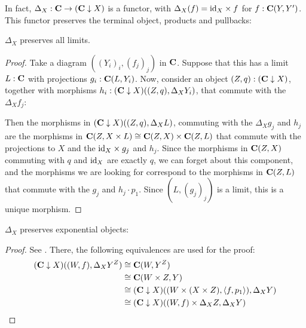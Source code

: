 In fact, $ \Delta_X : \mathbf{C} \to (\mathbf{C} \downarrow X) $ is a functor, with $ \Delta_X(f) = \text{id}_{X} \times f $ for $ f: \mathbf{C}(Y, Y^\prime) $. This functor preserves the terminal object, products and pullbacks:
\begin{lemma}\label{lem:delta-limits}
  $ \Delta_X $ preserves all limits.
\end{lemma}
\begin{proof}
  Take a diagram $ ((Y_i)_i, (f_j)_j) $ in $ \mathbf{C} $. Suppose that this has a limit $ L : \mathbf{C} $ with projections $ g_i : \mathbf{C}(L, Y_i) $. Now, consider an object $ (Z, q) : (\mathbf{C} \downarrow X) $, together with morphisms $ h_i : (\mathbf{C} \downarrow X)((Z, q), \Delta_X Y_i) $, that commute with the $ \Delta_X f_j $:
  \begin{center}
  \end{center}
  Then the morphisms in $ (\mathbf{C} \downarrow X)((Z, q), \Delta_X L) $, commuting with the $ \Delta_X g_j $ and $ h_j $ are the morphisms in $ \mathbf{C}(Z, X \times L) \cong \mathbf{C}(Z, X) \times \mathbf{C}(Z, L) $ that commute with the projections to $ X $ and the $ \text{id}_{X} \times g_j $ and $ h_j $. Since the morphisms in $ \mathbf{C}(Z, X) $ commuting with $ q $ and $ \text{id}_{X} $ are exactly $ q $, we can forget about this component, and the morphisms we are looking for correspond to the morphisms in $ \mathbf{C}(Z, L) $ that commute with the $ g_j $ and $ h_j \cdot p_1 $. Since $ (L, (g_j)_j) $ is a limit, this is a unique morphism.
\end{proof}

\begin{lemma}\label{lem:delta-exponentials}
  $ \Delta_X $ preserves exponential objects:
\end{lemma}
\begin{proof}
  See \autocite[][Volume 3, Lemma 5.8.2]{borceux}. There, the following equivalences are used for the proof:
  \begin{align*}
    (\mathbf{C} \downarrow X)((W, f), \Delta_X Y^Z) &\cong \mathbf{C}(W, Y^Z)\\
    &\cong \mathbf{C}(W \times Z, Y)\\
    &\cong (\mathbf{C} \downarrow X)((W \times (X \times Z), \langle f, p_1 \rangle), \Delta_X Y)\\
    &\cong (\mathbf{C} \downarrow X)((W, f) \times \Delta_X Z, \Delta_X Y)\\
  \end{align*}
\end{proof}


